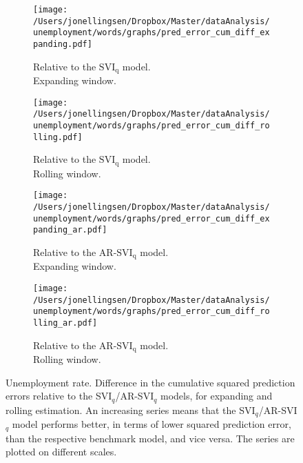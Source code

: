 \begin{figure}[!t]
    \centering
    \begin{subfigure}[b]{0.45\textwidth}
\caption{Relative to the $\text{SVI}_\text{q}$ model.\\Expanding window.}
\label{error_diff_urate_queries_plain_expanding}
        \texttt{[image: /Users/jonellingsen/Dropbox/Master/dataAnalysis/unemployment/words/graphs/pred\_error\_cum\_diff\_expanding.pdf]}
    \end{subfigure}\hfill
    \begin{subfigure}[b]{0.45\textwidth}
\caption{Relative to the $\text{SVI}_\text{q}$ model.\\Rolling window.}
\label{error_diff_urate_queries_plain_rolling}
        \texttt{[image: /Users/jonellingsen/Dropbox/Master/dataAnalysis/unemployment/words/graphs/pred\_error\_cum\_diff\_rolling.pdf]}
    \end{subfigure}
\begin{subfigure}[b]{0.45\textwidth}
 \caption{Relative to the AR-$\text{SVI}_\text{q}$ model.\\Expanding window.}
\label{error_diff_urate_queries_ar_expanding}       
\texttt{[image: /Users/jonellingsen/Dropbox/Master/dataAnalysis/unemployment/words/graphs/pred\_error\_cum\_diff\_expanding\_ar.pdf]}
    \end{subfigure}\hfill
\begin{subfigure}[b]{0.45\textwidth}
\caption{Relative to the AR-$\text{SVI}_\text{q}$ model.\\Rolling window.} 
\label{error_diff_urate_queries_ar_rolling}       
\texttt{[image: /Users/jonellingsen/Dropbox/Master/dataAnalysis/unemployment/words/graphs/pred\_error\_cum\_diff\_rolling\_ar.pdf]}
    \end{subfigure}
\caption{Unemployment rate. Difference in the cumulative squared prediction errors relative to the SVI$_q$/AR-SVI$_q$ models, for expanding and rolling estimation. An increasing series means that the SVI$_q$/AR-SVI$_q$ model performs better, in terms of lower squared prediction error, than the respective benchmark model, and vice versa. The series are plotted on different scales.}
\label{error_diff_urate_queries}
\end{figure}



